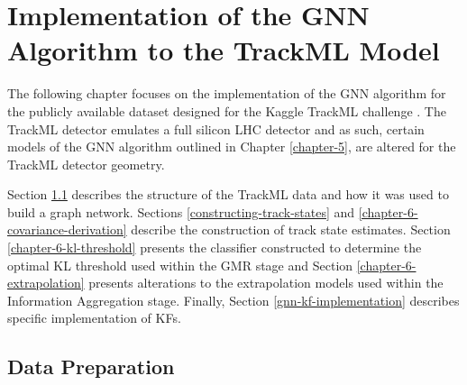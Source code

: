 


\chapter{Implementation of the GNN Algorithm to the TrackML Model}
\label{chapter-6}

The following chapter focuses on the implementation of the GNN algorithm for the publicly available dataset designed for the Kaggle TrackML challenge \cite{kaggle-trackml}. The TrackML detector emulates a full silicon LHC detector and as such, certain models of the GNN algorithm outlined in Chapter \ref{chapter-5}, are altered for the TrackML detector geometry.

Section \ref{chapter-6-data-prep} describes the structure of the TrackML data and how it was used to build a graph network. Sections \ref{constructing-track-states} and \ref{chapter-6-covariance-derivation} describe the construction of track state estimates. Section \ref{chapter-6-kl-threshold} presents the classifier constructed to determine the optimal KL threshold used within the GMR stage and Section \ref{chapter-6-extrapolation} presents alterations to the extrapolation models used within the Information Aggregation stage. Finally, Section \ref{gnn-kf-implementation} describes specific implementation of KFs. 
 





\section{Data Preparation}
\label{chapter-6-data-prep}



